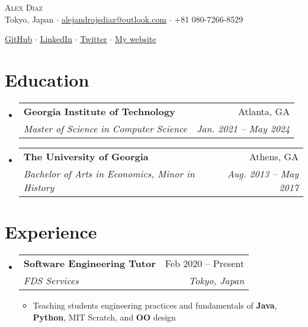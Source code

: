 \documentclass[12pt, letterpaper]{article}
\makeatletter
\newcommand{\resumeItem}[1]{
  \item\small{
    {#1 \vspace{-2pt}}
  }
}
\newcommand{\resumeSubheading}[4]{
  \vspace{-2pt}\item
    \begin{tabular*}{0.97\textwidth}[t]{l@{\extracolsep{\fill}}r}
      \textbf{#1} & #2 \\
      \textit{\small#3} & \textit{\small #4} \\
    \end{tabular*}\vspace{-7pt}
}
\newcommand{\resumeSubHeadingListStart}{\begin{itemize}[leftmargin=0.15in, label={}]}
\newcommand{\resumeSubHeadingListEnd}{\end{itemize}}
\newcommand{\resumeItemListStart}{\begin{itemize}} %
\newcommand{\resumeItemListEnd}{\end{itemize}\vspace{-16pt}}
\makeatother
\begin{document}
    

\vspace*{-12pt}
\begin{center}
	{\Huge \scshape {Alex Diaz}}\\
	\vspace{1mm}
	\faMapMarker \hspace{.5mm} Tokyo, Japan $\cdot$ 
	\faEnvelope \hspace{.5mm} \href{mailto:alejandrojsdiaz@outlook.com}{alejandrojsdiaz@outlook.com} $\cdot$ \faMobile \hspace{.5mm} +81 080-7266-8529
		
	\faGithub \hspace{.5mm} \href{https://github.com/calmcoconut}{GitHub} $\cdot$
	\faLinkedin \hspace{.5mm} \href{https://www.linkedin.com/in/diazjalejandro/}{LinkedIn} $\cdot$
	\faTwitter \hspace{.5mm} \href{https://twitter.com/greetingsfriend}{Twitter} $\cdot$
    \faBriefcase \hspace{.5mm} \href{https://calmcoconut.github.io/diasDiaz/}{My website}
    \\
\end{center}


\section{Education}
  \resumeSubHeadingListStart
    \resumeSubheading
      {Georgia Institute of Technology}{Atlanta, GA}
      {Master of Science in Computer Science}{Jan. 2021 -- May 2024}
    \resumeSubheading
      {The University of Georgia}{Athens, GA}
      {Bachelor of Arts in Economics, Minor in History}{Aug. 2013 -- May 2017}
 \resumeSubHeadingListEnd

\section{Experience}

\resumeSubHeadingListStart
  \resumeSubheading
    {Software Engineering Tutor}{Feb 2020 -- Present}
    {FDS Services}{Tokyo, Japan}
    \resumeItemListStart
      \resumeItem{Teaching students engineering practices and fundamentals of \textbf{Java}, \textbf{Python}, MIT Scratch, and \textbf{OO} design}
    \resumeItemListEnd
    \resumeSubHeadingListEnd
\end{document}
